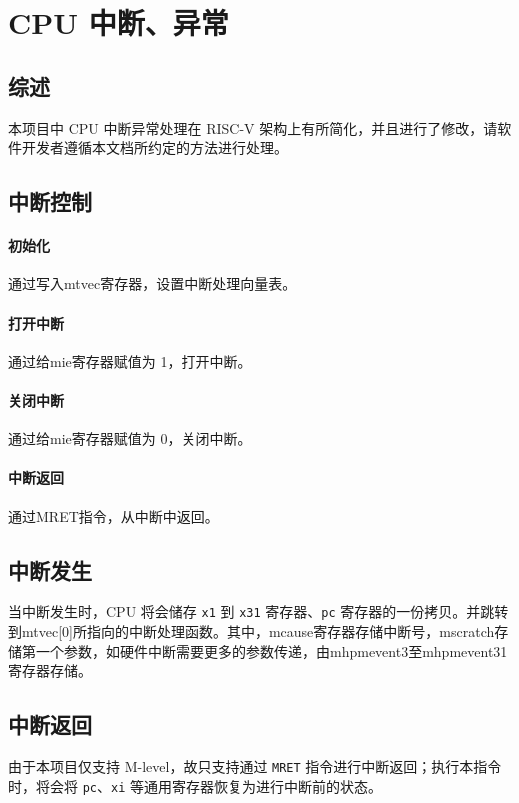 
\chapter{CPU 中断、异常}

\section{综述}
本项目中 CPU 中断异常处理在 RISC-V 架构上有所简化，并且进行了修改，请软件开发者遵循本文档所约定的方法进行处理。

\section{中断控制}

\subsubsection{初始化}
通过写入mtvec寄存器，设置中断处理向量表。

\subsubsection{打开中断}
通过给mie寄存器赋值为 1，打开中断。

\subsubsection{关闭中断}
通过给mie寄存器赋值为 0，关闭中断。

\subsubsection{中断返回}
通过MRET指令，从中断中返回。

\section{中断发生}

当中断发生时，CPU 将会储存 \texttt{x1} 到 \texttt{x31} 寄存器、\texttt{pc} 寄存器的一份拷贝。并跳转到mtvec[0]所指向的中断处理函数。其中，mcause寄存器存储中断号，mscratch存储第一个参数，如硬件中断需要更多的参数传递，由mhpmevent3至mhpmevent31寄存器存储。

\section{中断返回}

由于本项目仅支持 M-level，故只支持通过 \texttt{MRET} 指令进行中断返回；执行本指令时，将会将 \texttt{pc}、\texttt{xi} 等通用寄存器恢复为进行中断前的状态。


